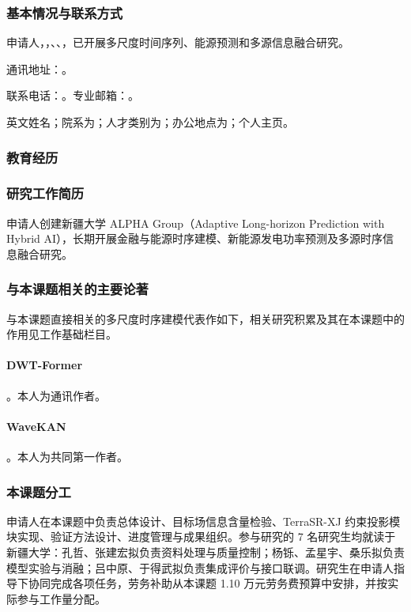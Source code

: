\subsubsection{基本情况与联系方式}
申请人，，、、，已开展多尺度时间序列、能源预测和多源信息融合研究。

通讯地址：。

联系电话：。专业邮箱：。

英文姓名；院系为；人才类别为；办公地点为；个人主页。

\subsubsection{教育经历}


\subsubsection{研究工作简历}


申请人创建新疆大学 ALPHA Group（Adaptive Long-horizon Prediction with Hybrid AI），长期开展金融与能源时序建模、新能源发电功率预测及多源时序信息融合研究。

\subsubsection{与本课题相关的主要论著}
与本课题直接相关的多尺度时序建模代表作如下，相关研究积累及其在本课题中的作用见工作基础栏目。

\paragraph{DWT-Former}
。本人为通讯作者。

\paragraph{WaveKAN}
。本人为共同第一作者。

\subsubsection{本课题分工}

申请人在本课题中负责总体设计、目标场信息含量检验、TerraSR-XJ 约束投影模块实现、验证方法设计、进度管理与成果组织。参与研究的 7 名研究生均就读于新疆大学：\mbox{孔哲}、\mbox{张建宏}拟负责资料处理与质量控制；\mbox{杨铄}、\mbox{孟星宇}、\mbox{桑乐}拟负责模型实验与消融；\mbox{吕中原}、\mbox{于得武}拟负责集成评价与接口联调。研究生在申请人指导下协同完成各项任务，劳务补助从本课题 1.10 万元劳务费预算中安排，并按实际参与工作量分配。
